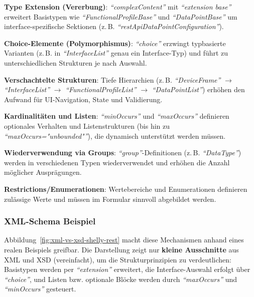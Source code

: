 \documentclass[a4paper,12pt]{article}
\newcommand{\xmlelement}[1]{\textit{``#1''}}
\newcommand{\xmlattr}[1]{\textit{``#1''}}
\begin{document}
\noindent\textbf{Type Extension (Vererbung)}: \xmlelement{complexContent} mit \xmlattr{extension base} erweitert 
Basistypen wie \xmlelement{FunctionalProfileBase} und \xmlelement{DataPointBase} um interface-spezifische 
Sektionen (z.\,B. \xmlelement{restApiDataPointConfiguration}).
\newline

\noindent\textbf{Choice-Elemente (Polymorphismus)}: \xmlelement{choice} erzwingt typbasierte Varianten 
(z.\,B. in \xmlelement{InterfaceList} genau ein Interface-Typ) und führt zu unterschiedlichen Strukturen je 
nach Auswahl.
\newline

\noindent\textbf{Verschachtelte Strukturen}: Tiefe Hierarchien 
(z.\,B. \xmlelement{DeviceFrame} $\rightarrow$ \xmlelement{InterfaceList} $\rightarrow$ 
\xmlelement{FunctionalProfileList} $\rightarrow$ \xmlelement{DataPointList}) erhöhen den Aufwand für 
UI-Navigation, State und Validierung.
\newline

\noindent\textbf{Kardinalitäten und Listen}: \xmlattr{minOccurs} und \xmlattr{maxOccurs} definieren optionales 
Verhalten und Listenstrukturen (bis hin zu \xmlattr{maxOccurs="unbounded"}), die dynamisch unterstützt werden 
müssen.
\newline

\noindent\textbf{Wiederverwendung via Groups}: \xmlelement{group}-Definitionen (z.\,B. \xmlelement{DataType}) 
werden in verschiedenen Typen wiederverwendet und erhöhen die Anzahl möglicher Ausprägungen.
\newline

\noindent\textbf{Restrictions/Enumerationen}: Wertebereiche und Enumerationen definieren zulässige Werte und 
müssen im Formular sinnvoll abgebildet werden.

\subsubsection{XML-Schema Beispiel}

Abbildung~\ref{fig:xml-vs-xsd-shelly-rest} macht diese Mechanismen anhand eines realen Beispiels greifbar. Die 
Darstellung zeigt nur \textbf{kleine Ausschnitte} aus XML und XSD (vereinfacht), um die Strukturprinzipien zu 
verdeutlichen: Basistypen werden per \xmlelement{extension} erweitert, die Interface-Auswahl erfolgt über 
\xmlelement{choice}, und Listen bzw. optionale Blöcke werden durch \xmlattr{maxOccurs} und \xmlattr{minOccurs} 
gesteuert.
\end{document}
